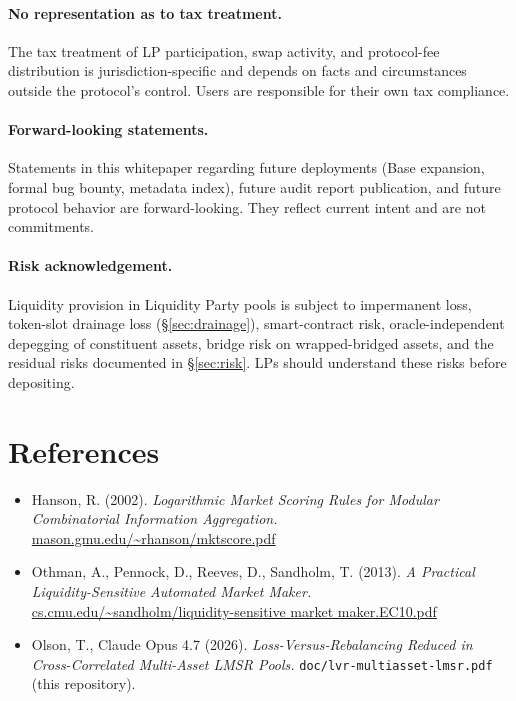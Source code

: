 \documentclass[11pt]{article}
\begin{document}
\paragraph{No representation as to tax treatment.}
The tax treatment of LP participation, swap activity, and protocol-fee
distribution is jurisdiction-specific and depends on facts and
circumstances outside the protocol's control. Users are responsible
for their own tax compliance.

\paragraph{Forward-looking statements.}
Statements in this whitepaper regarding future deployments (Base
expansion, formal bug bounty, metadata index), future audit report
publication, and future protocol behavior are forward-looking. They
reflect current intent and are not commitments.

\paragraph{Risk acknowledgement.}
Liquidity provision in Liquidity Party pools is subject to impermanent
loss, token-slot drainage loss (\S\ref{sec:drainage}), smart-contract risk,
oracle-independent depegging of constituent assets, bridge risk on
wrapped-bridged assets, and the residual risks documented in
\S\ref{sec:risk}. LPs should understand these risks before depositing.

\section*{References}

\begin{itemize}
  \item Hanson, R. (2002). \emph{Logarithmic Market Scoring Rules for Modular
        Combinatorial Information Aggregation.}
        \href{https://mason.gmu.edu/~rhanson/mktscore.pdf}{mason.gmu.edu/\textasciitilde{}rhanson/mktscore.pdf}
  \item Othman, A., Pennock, D., Reeves, D., Sandholm, T. (2013).
        \emph{A Practical Liquidity-Sensitive Automated Market Maker.}
        \href{https://www.cs.cmu.edu/~sandholm/liquidity-sensitive\%20market\%20maker.EC10.pdf}{cs.cmu.edu/\textasciitilde{}sandholm/liquidity-sensitive market maker.EC10.pdf}
  \item Olson, T., Claude Opus 4.7 (2026). \emph{Loss-Versus-Rebalancing
        Reduced in Cross-Correlated Multi-Asset LMSR Pools.}
        \texttt{doc/lvr-multiasset-lmsr.pdf} (this repository).
\end{itemize}
\end{document}
